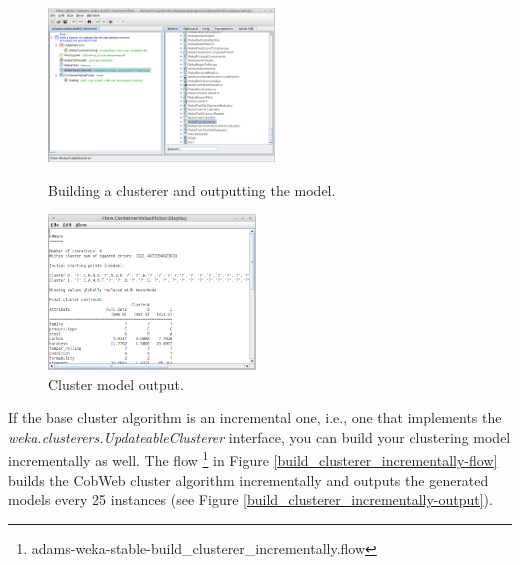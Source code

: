 \begin{figure}[ht]
  \begin{minipage}[t]{0.5\linewidth}
    \centering
    \includegraphics[width=6.0cm]{images/build_clusterer-flow.png}
    \caption{Building a clusterer and outputting the model.}
    \label{build_clusterer-flow}
  \end{minipage}
  \hspace{0.5cm}
  \begin{minipage}[t]{0.5\linewidth}
    \centering
    \includegraphics[width=5.5cm]{images/build_clusterer-output.png}
    \caption{Cluster model output.}
    \label{build_clusterer-output}
  \end{minipage}
\end{figure}

If the base cluster algorithm is an incremental one, i.e., one that implements
the \textit{weka.clusterers.UpdateableClusterer} interface, you can build your
clustering model incrementally as well. The flow
\footnote{adams-weka-stable-build\_clusterer\_incrementally.flow} in Figure
\ref{build_clusterer_incrementally-flow} builds the CobWeb cluster algorithm
incrementally and outputs the generated models every 25 instances (see Figure
\ref{build_clusterer_incrementally-output}).

